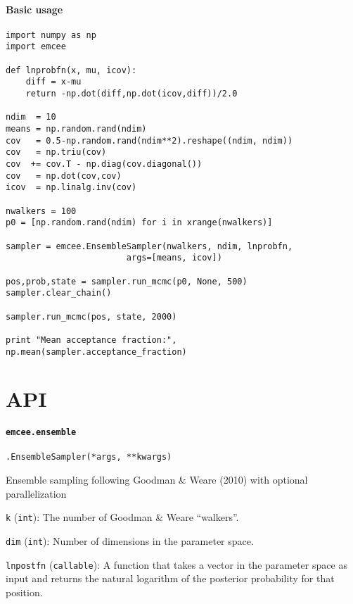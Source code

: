 \documentclass[12pt,preprint]{aastex}
\newcommand{\project}[1]{{\sffamily #1}}
\newcommand{\thisplain}{emcee}
\newcommand{\this}{\project{\thisplain}}
\newlength{\argmarg}
\newcommand{\code}[1]{\texttt{#1}}
\newcommand{\class}[3]{\def\curclass{#1}
                \noindent{\scriptsize\this}\texttt{.}\code{#1{\small (#2)}}
                \begin{list}{}{\setlength{\leftmargin}{0.5\argmarg}}
                {\item #3}\end{list}}
\newcommand{\param}[3]{{\item {\code{#1}} {\footnotesize (\code{#2})}: #3}}
\newenvironment{arglist}[1]{\noindent\hspace{0.5\argmarg}{\bf {#1}}
    \begin{list}{}{
        \setlength{\leftmargin}{\argmarg}
    }}
    {\end{list}}
\newenvironment{args}{\begin{arglist}{Arguments}}{\end{arglist}}
\begin{document}
\paragraph{Basic usage}
\begin{lstlisting}
import numpy as np
import emcee

def lnprobfn(x, mu, icov):
    diff = x-mu
    return -np.dot(diff,np.dot(icov,diff))/2.0

ndim  = 10
means = np.random.rand(ndim)
cov   = 0.5-np.random.rand(ndim**2).reshape((ndim, ndim))
cov   = np.triu(cov)
cov  += cov.T - np.diag(cov.diagonal())
cov   = np.dot(cov,cov)
icov  = np.linalg.inv(cov)

nwalkers = 100
p0 = [np.random.rand(ndim) for i in xrange(nwalkers)]

sampler = emcee.EnsembleSampler(nwalkers, ndim, lnprobfn,
                        args=[means, icov])

pos,prob,state = sampler.run_mcmc(p0, None, 500)
sampler.clear_chain()

sampler.run_mcmc(pos, state, 2000)

print "Mean acceptance fraction:", np.mean(sampler.acceptance_fraction)
\end{lstlisting}

\section{API}

\paragraph{\code{\thisplain.ensemble}}

\class{EnsembleSampler}{*args, **kwargs}
    {Ensemble sampling following Goodman \& Weare (2010) with optional
    parallelization}

\begin{args}
    \param{k}{int}{The number of Goodman \& Weare ``walkers''.}
    \param{dim}{int}{Number of dimensions in the parameter space.}
    \param{lnpostfn}{callable}{%
        A function that takes a vector in the parameter space as input and
        returns the natural logarithm of the posterior probability for that
        position.
    }
\end{args}
\end{document}
